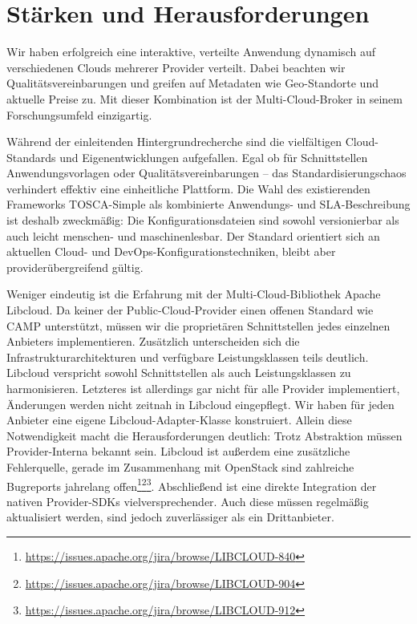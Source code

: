 \section{Stärken und Herausforderungen}

Wir haben erfolgreich eine interaktive, verteilte Anwendung dynamisch auf verschiedenen Clouds mehrerer Provider verteilt. Dabei beachten wir Qualitätsvereinbarungen und greifen auf Metadaten wie Geo-Standorte und aktuelle Preise zu. Mit dieser Kombination ist der Multi-Cloud-Broker in seinem Forschungsumfeld einzigartig.

Während der einleitenden Hintergrundrecherche sind die vielfältigen Cloud-Standards und Eigenentwicklungen aufgefallen. Egal ob für Schnittstellen Anwendungsvorlagen oder Qualitätsvereinbarungen -- das Standardisierungschaos verhindert effektiv eine einheitliche Plattform. Die Wahl des existierenden Frameworks TOSCA-Simple als kombinierte Anwendungs- und SLA-Beschreibung ist deshalb zweckmäßig: Die Konfigurationsdateien sind sowohl versionierbar als auch leicht menschen- und maschinenlesbar. Der Standard orientiert sich an aktuellen Cloud- und DevOps-Konfigurationstechniken, bleibt aber providerübergreifend gültig.

Weniger eindeutig ist die Erfahrung mit der Multi-Cloud-Bibliothek Apache Libcloud. Da keiner der Public-Cloud-Provider einen offenen Standard wie CAMP unterstützt, müssen wir die proprietären Schnittstellen jedes einzelnen Anbieters implementieren. Zusätzlich unterscheiden sich die Infrastrukturarchitekturen und verfügbare Leistungsklassen teils deutlich. Libcloud verspricht sowohl Schnittstellen als auch Leistungsklassen zu harmonisieren. Letzteres ist allerdings gar nicht für alle Provider implementiert, Änderungen werden nicht zeitnah in Libcloud eingepflegt. Wir haben für jeden Anbieter eine eigene Libcloud-Adapter-Klasse konstruiert. Allein diese Notwendigkeit macht die Herausforderungen deutlich: Trotz Abstraktion müssen Provider-Interna bekannt sein. Libcloud ist außerdem eine zusätzliche Fehlerquelle, gerade im Zusammenhang mit OpenStack sind zahlreiche Bugreports jahrelang offen\footnote{\url{https://issues.apache.org/jira/browse/LIBCLOUD-840}}\footnote{\url{https://issues.apache.org/jira/browse/LIBCLOUD-904}}\footnote{\url{https://issues.apache.org/jira/browse/LIBCLOUD-912}}. Abschließend ist eine direkte Integration der nativen Provider-SDKs vielversprechender. Auch diese müssen regelmäßig aktualisiert werden, sind jedoch zuverlässiger als ein Drittanbieter.

